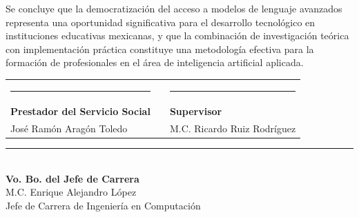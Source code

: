 \documentclass[12pt,letterpaper]{article}
\begin{document}
Se concluye que la democratización del acceso a modelos de lenguaje avanzados representa una oportunidad significativa para el desarrollo tecnológico en instituciones educativas mexicanas, y que la combinación de investigación teórica con implementación práctica constituye una metodología efectiva para la formación de profesionales en el área de inteligencia artificial aplicada.

\vspace{1.5cm}

\begin{center}
\begin{tabular}{p{6cm}p{1.5cm}p{6cm}}
\centering\rule{5.5cm}{0.4pt} & & \centering\rule{5.5cm}{0.4pt}\tabularnewline[0.3cm]
\centering\textbf{Prestador del Servicio Social} & & \centering\textbf{Supervisor}\tabularnewline[0.3cm]
\centering José Ramón Aragón Toledo & & \centering M.C. Ricardo Ruiz Rodríguez\tabularnewline
\end{tabular}

\vspace{1.5cm}

\rule{6cm}{0.4pt}\\[0.3cm]
\textbf{Vo. Bo. del Jefe de Carrera}\\[0.5cm]
M.C. Enrique Alejandro López\\
Jefe de Carrera de Ingeniería en Computación
\end{center}
\end{document}
